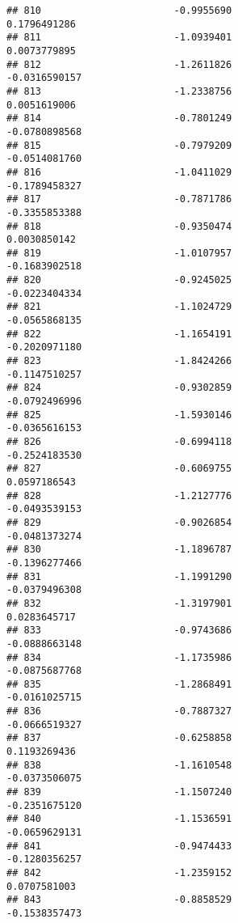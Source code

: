\documentclass[
]{article}
\begin{document}
\begin{verbatim}
## 810                       -0.9955690                          0.1796491286
## 811                       -1.0939401                          0.0073779895
## 812                       -1.2611826                         -0.0316590157
## 813                       -1.2338756                          0.0051619006
## 814                       -0.7801249                         -0.0780898568
## 815                       -0.7979209                         -0.0514081760
## 816                       -1.0411029                         -0.1789458327
## 817                       -0.7871786                         -0.3355853388
## 818                       -0.9350474                          0.0030850142
## 819                       -1.0107957                         -0.1683902518
## 820                       -0.9245025                         -0.0223404334
## 821                       -1.1024729                         -0.0565868135
## 822                       -1.1654191                         -0.2020971180
## 823                       -1.8424266                         -0.1147510257
## 824                       -0.9302859                         -0.0792496996
## 825                       -1.5930146                         -0.0365616153
## 826                       -0.6994118                         -0.2524183530
## 827                       -0.6069755                          0.0597186543
## 828                       -1.2127776                         -0.0493539153
## 829                       -0.9026854                         -0.0481373274
## 830                       -1.1896787                         -0.1396277466
## 831                       -1.1991290                         -0.0379496308
## 832                       -1.3197901                          0.0283645717
## 833                       -0.9743686                         -0.0888663148
## 834                       -1.1735986                         -0.0875687768
## 835                       -1.2868491                         -0.0161025715
## 836                       -0.7887327                         -0.0666519327
## 837                       -0.6258858                          0.1193269436
## 838                       -1.1610548                         -0.0373506075
## 839                       -1.1507240                         -0.2351675120
## 840                       -1.1536591                         -0.0659629131
## 841                       -0.9474433                         -0.1280356257
## 842                       -1.2359152                          0.0707581003
## 843                       -0.8858529                         -0.1538357473

\end{verbatim}
\end{document}
